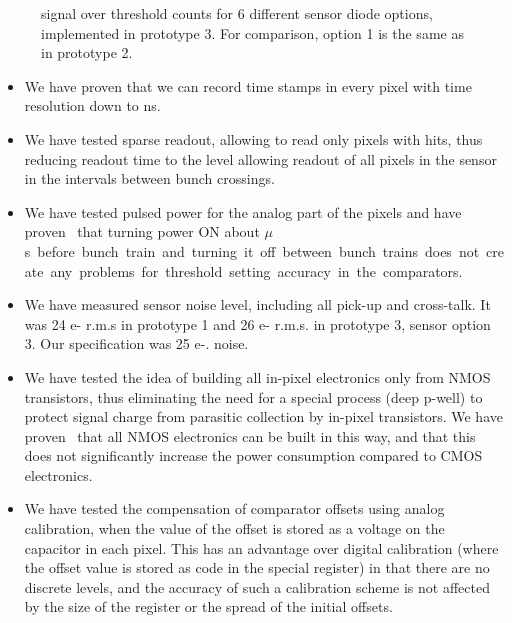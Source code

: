 \begin{figure}
\begin{minipage}[t]{0.49\textwidth}
    \caption{ signal over threshold counts for 6 different sensor diode options,
implemented in prototype 3. For comparison, option 1 is the same as in prototype 2.}
    \label{fig:VertexDetector:ChronoPixel:Fe55Response}
\end{minipage}
\end{figure}
\begin{itemize}
    \item We have proven that we can record time stamps in every pixel with time resolution down to \unit[150]{ns}.
    \item We have tested sparse readout, allowing to read only pixels with hits, thus reducing readout time to the level allowing readout of all pixels in the sensor in the intervals between bunch crossings.
    \item We have tested pulsed power for the analog part of the pixels and have proven~\cite{sinev:Chronopix:FirstPrototype} that turning power ON about \unit[100]{$\mu$s} before bunch train and turning it off between bunch trains does not create any problems for threshold setting accuracy in the comparators.
    \item We have measured sensor noise level, including all pick-up and cross-talk. It was 24 e- r.m.s in prototype 1 and 26 e- r.m.s. in prototype 3, sensor option 3. Our specification was 25 e-.
noise.
    \item We have tested the idea of building all in-pixel electronics only from NMOS transistors, thus eliminating the need for a special process (deep p-well) to protect signal charge from parasitic collection by in-pixel transistors. We have proven~\cite{sinev:Chronopixel:RnDstatus2013} that all NMOS electronics can be built in this way, and that this does not significantly increase the power consumption compared to CMOS electronics.
    \item We have tested the compensation of comparator offsets using analog calibration, when the value of the offset is stored as a voltage on the capacitor in each pixel. This has an advantage over digital calibration (where the offset value is stored as code in the special register) in that there are no discrete levels, and the accuracy of such a calibration scheme is not affected by the size of the register or the spread of the initial offsets.
\end{itemize}

